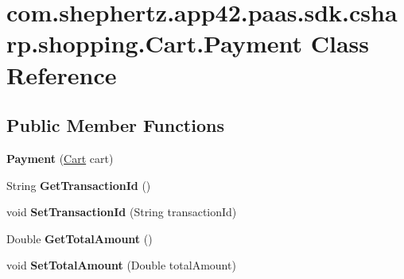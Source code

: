 \hypertarget{classcom_1_1shephertz_1_1app42_1_1paas_1_1sdk_1_1csharp_1_1shopping_1_1_cart_1_1_payment}{\section{com.\+shephertz.\+app42.\+paas.\+sdk.\+csharp.\+shopping.\+Cart.\+Payment Class Reference}
\label{classcom_1_1shephertz_1_1app42_1_1paas_1_1sdk_1_1csharp_1_1shopping_1_1_cart_1_1_payment}
}
\subsection*{Public Member Functions}
\begin{DoxyCompactItemize}
\item 
\hypertarget{classcom_1_1shephertz_1_1app42_1_1paas_1_1sdk_1_1csharp_1_1shopping_1_1_cart_1_1_payment_ad257a42342eebf548dd8430ee506bacf}{{\bfseries Payment} (\hyperlink{classcom_1_1shephertz_1_1app42_1_1paas_1_1sdk_1_1csharp_1_1shopping_1_1_cart}{Cart} cart)}\label{classcom_1_1shephertz_1_1app42_1_1paas_1_1sdk_1_1csharp_1_1shopping_1_1_cart_1_1_payment_ad257a42342eebf548dd8430ee506bacf}

\item 
\hypertarget{classcom_1_1shephertz_1_1app42_1_1paas_1_1sdk_1_1csharp_1_1shopping_1_1_cart_1_1_payment_aced490434dc7d566cc013d55a10b5c8a}{String {\bfseries Get\+Transaction\+Id} ()}\label{classcom_1_1shephertz_1_1app42_1_1paas_1_1sdk_1_1csharp_1_1shopping_1_1_cart_1_1_payment_aced490434dc7d566cc013d55a10b5c8a}

\item 
\hypertarget{classcom_1_1shephertz_1_1app42_1_1paas_1_1sdk_1_1csharp_1_1shopping_1_1_cart_1_1_payment_a939b20ce0e9dda12f5278d709f6edf60}{void {\bfseries Set\+Transaction\+Id} (String transaction\+Id)}\label{classcom_1_1shephertz_1_1app42_1_1paas_1_1sdk_1_1csharp_1_1shopping_1_1_cart_1_1_payment_a939b20ce0e9dda12f5278d709f6edf60}

\item 
\hypertarget{classcom_1_1shephertz_1_1app42_1_1paas_1_1sdk_1_1csharp_1_1shopping_1_1_cart_1_1_payment_ab422c9db148cce9c6ae90d215196ed6b}{Double {\bfseries Get\+Total\+Amount} ()}\label{classcom_1_1shephertz_1_1app42_1_1paas_1_1sdk_1_1csharp_1_1shopping_1_1_cart_1_1_payment_ab422c9db148cce9c6ae90d215196ed6b}

\item 
\hypertarget{classcom_1_1shephertz_1_1app42_1_1paas_1_1sdk_1_1csharp_1_1shopping_1_1_cart_1_1_payment_afa94dccfa5698360f32ee7b2764c3fb3}{void {\bfseries Set\+Total\+Amount} (Double total\+Amount)}\label{classcom_1_1shephertz_1_1app42_1_1paas_1_1sdk_1_1csharp_1_1shopping_1_1_cart_1_1_payment_afa94dccfa5698360f32ee7b2764c3fb3}


\end{DoxyCompactItemize}
